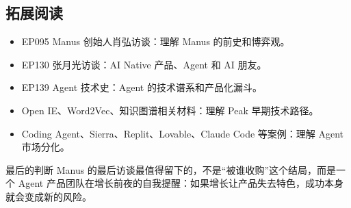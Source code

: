\subsection{拓展阅读}

\begin{itemize}
\item EP095 Manus 创始人肖弘访谈：理解 Manus 的前史和博弈观。
\item EP130 张月光访谈：AI Native 产品、Agent 和 AI 朋友。
\item EP139 Agent 技术史：Agent 的技术谱系和产品化漏斗。
\item Open IE、Word2Vec、知识图谱相关材料：理解 Peak 早期技术路径。
\item Coding Agent、Sierra、Replit、Lovable、Claude Code 等案例：理解 Agent 市场分化。
\end{itemize}

\begin{importantbox}{最后的判断}
Manus 的最后访谈最值得留下的，不是“被谁收购”这个结局，而是一个 Agent 产品团队在增长前夜的自我提醒：如果增长让产品失去特色，成功本身就会变成新的风险。
\end{importantbox}


